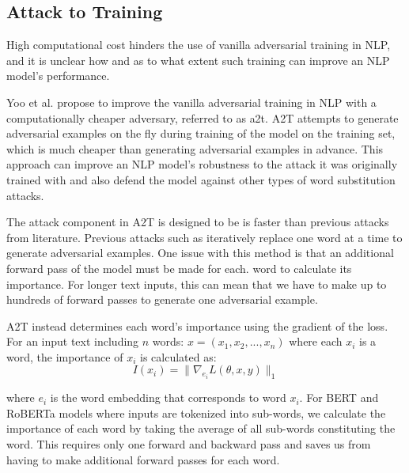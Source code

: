 \subsection{Attack to Training}\label{subsec:a2t}
High computational cost hinders the use of vanilla adversarial training in NLP, and it is unclear how and as to what extent such training can improve an NLP model's performance.

Yoo et al. \cite{https://doi.org/10.48550/arxiv.2109.00544} propose to improve the vanilla
adversarial training in NLP with a computationally cheaper adversary, referred to as \acrfull{a2t}. 
A2T attempts to generate adversarial examples on the fly during training of the model on the training set, which is much cheaper than generating adversarial examples in advance.
This approach can improve an NLP model's robustness to the attack it was originally trained with and also defend the model against other types of word substitution attacks.

The attack component in A2T is designed to be is faster than previous attacks from literature. Previous attacks such as \cite{conf/emnlp/GargR20, journals/corr/abs-1907-11932} iteratively replace one word at a time to generate adversarial examples.
One issue with this method is that an additional
forward pass of the model must be made for each.
word to calculate its importance. For longer text inputs, this can mean that we have to make up to hundreds of forward passes to generate one adversarial example.

A2T instead determines each word's importance
using the gradient of the loss. For an input text including $n$ words: $x = (x_1, x_2, . . . , x_n)$ where each $x_i$ is a word, the importance of $x_i$ is calculated as:
\begin{equation}
    I(x_i) = \| \nabla_{e_i} L(\theta, x, y) \|_1
\end{equation}

where $e_i$ is the word embedding that corresponds to word $x_i$. For BERT and RoBERTa models where inputs are tokenized into sub-words, we calculate the importance of each word by taking the average of all sub-words constituting the word. This requires only one forward and backward
pass and saves us from having to make additional forward passes for each word.
